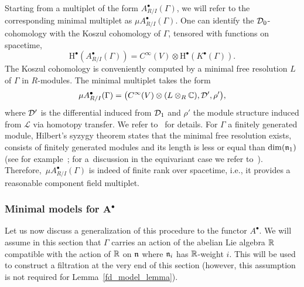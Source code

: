 \documentclass[pdftex]{sigma}
\numberwithin{equation}{section}
\def\sL{\mathscr L}
\begin{document}
Starting from a multiplet of the form $A^\bullet_{R/I}(\Gamma)$, we will refer to the corresponding minimal multiplet as $\mu A^\bullet_{R/I}(\Gamma)$.
One can identify the $\mathcal D_0$-cohomology with the Koszul cohomology of $\Gamma$, tensored with functions on spacetime,
\begin{equation*}
\mathrm H^\bullet(A_{R/I}^\bullet(\Gamma)) = C^\infty(V) \otimes \mathrm H^\bullet(K^\bullet(\Gamma)) .
\end{equation*}
The Koszul cohomology is conveniently computed by a minimal free resolution $L$ of $\Gamma$ in $R$-modules. The minimal multiplet takes the form
\begin{equation*}
\mu A^\bullet_{R/I}(\Gamma) = \big( C^\infty(V) \otimes (L \otimes_R \mathbb C) , \mathcal D' ,\rho' \big) ,
\end{equation*}
where $\mathcal D'$ is the differential induced from $\mathcal D_1$ and $\rho'$ the module structure induced from $\sL$ via homotopy transfer. We refer to~\cite{perspectives} for details. For $\Gamma$ a finitely generated module, Hilbert's syzygy theorem states that the minimal free resolution exists, consists of finitely generated modules and its length is less or equal than $\dim(\mathfrak n_1)$ (see for example~\cite[Theorem 1.13]{MR1322960}; for a~discussion in the equivariant case we refer to~\cite[Proposition 2.4.9, Remark 2.4.10]{Galetto}). Therefore,~$\mu A_{R/I}^\bullet(\Gamma)$ is indeed of finite rank over spacetime, i.e., it provides a reasonable component field multiplet.

\subsubsection[Minimal models for A\^{}bullet]{Minimal models for $\boldsymbol{A^\bullet}$}

Let us now discuss a generalization of this procedure to the functor $A^\bullet$. We will assume in this section that $\Gamma$ carries an action of the abelian Lie algebra $\mathbb R$ compatible with the action of $\mathbb R$ on $\mathfrak n$ where $\mathfrak n_i$ has $\mathbb R$-weight $i$. This will be used to construct a filtration at the very end of this section (however, this assumption is not required for Lemma~\ref{fd_model_lemma}).
\end{document}
